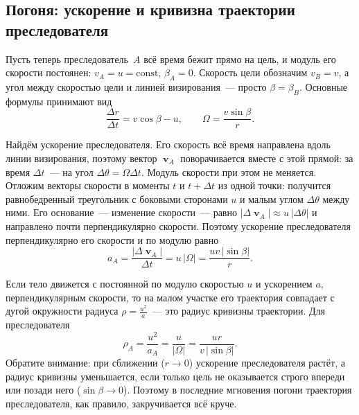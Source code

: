 \documentclass[../main.tex]{subfiles}
\begin{document}
\subsection{Погоня: ускорение и кривизна траектории преследователя}

Пусть теперь преследователь~$A$ всё время бежит прямо на цель, и модуль его
скорости постоянен: $v_A = u = \mathrm{const}$, $\beta_A = 0$. Скорость цели
обозначим $v_B = v$, а угол между скоростью цели и линией визирования~--- просто
$\beta = \beta_B$. Основные формулы принимают вид
\[
\frac{\Delta r}{\Delta t} = v\cos\beta - u,
\qquad
\Omega = \frac{v\sin\beta}{r}.
\]

Найдём ускорение преследователя. Его скорость всё время направлена вдоль линии
визирования, поэтому вектор $\mbfv_A$ поворачивается вместе с этой прямой: за время
$\Delta t$~--- на угол $\Delta\theta = \Omega\Delta t$. Модуль скорости при этом не
меняется. Отложим векторы скорости в моменты $t$ и $t + \Delta t$ из одной точки:
получится равнобедренный треугольник с боковыми сторонами $u$ и малым углом
$\Delta\theta$ между ними. Его основание~--- изменение скорости~--- равно
$|\Delta\mbfv_A| \approx u\,|\Delta\theta|$ и направлено почти перпендикулярно
скорости. Поэтому ускорение преследователя перпендикулярно его скорости и по модулю
равно
\[
a_A = \frac{|\Delta\mbfv_A|}{\Delta t} = u\,|\Omega| = \frac{uv\,|\sin\beta|}{r}.
\]

Если тело движется с постоянной по модулю скоростью $u$ и ускорением $a$,
перпендикулярным скорости, то на малом участке его траектория совпадает с дугой
окружности радиуса $\rho = \frac{u^2}{a}$~--- это радиус кривизны траектории.
Для преследователя
\[
\rho_A = \frac{u^2}{a_A} = \frac{u}{|\Omega|} = \frac{ur}{v\,|\sin\beta|}.
\]
Обратите внимание: при сближении ($r \to 0$) ускорение преследователя растёт, а
радиус кривизны уменьшается, если только цель не оказывается строго впереди или
позади него ($\sin\beta \to 0$). Поэтому в последние мгновения погони траектория
преследователя, как правило, закручивается всё круче.
\end{document}
